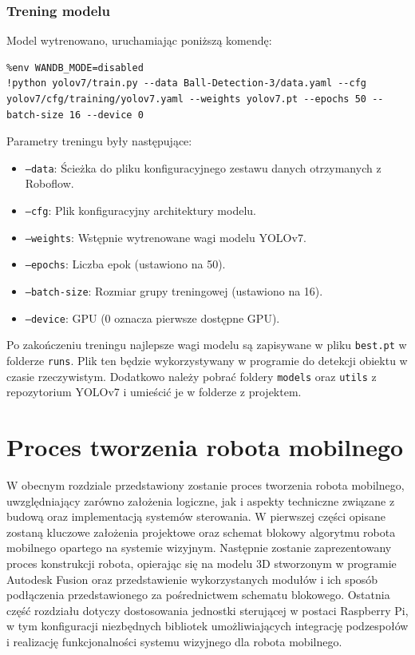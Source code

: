 \documentclass[a4paper,twoside,12pt]{book}
\begin{document}
\subsection{Trening modelu}
Model wytrenowano, uruchamiając poniższą komendę:
\begin{verbatim}
%env WANDB_MODE=disabled
!python yolov7/train.py --data Ball-Detection-3/data.yaml --cfg yolov7/cfg/training/yolov7.yaml --weights yolov7.pt --epochs 50 --batch-size 16 --device 0
\end{verbatim}
Parametry treningu były następujące:
\begin{itemize}
    \item \texttt{--data}: Ścieżka do pliku konfiguracyjnego zestawu danych otrzymanych z Roboflow.
    \item \texttt{--cfg}: Plik konfiguracyjny architektury modelu.
    \item \texttt{--weights}: Wstępnie wytrenowane wagi modelu YOLOv7.
    \item \texttt{--epochs}: Liczba epok (ustawiono na 50).
    \item \texttt{--batch-size}: Rozmiar grupy treningowej (ustawiono na 16).
    \item \texttt{--device}: GPU (0 oznacza pierwsze dostępne GPU).
\end{itemize}
Po zakończeniu treningu najlepsze wagi modelu są zapisywane w pliku \texttt{best.pt} w folderze \texttt{runs}. Plik ten będzie wykorzystywany w programie do detekcji obiektu w czasie rzeczywistym.
Dodatkowo należy pobrać foldery \texttt{models} oraz \texttt{utils} z repozytorium YOLOv7 i umieścić je w folderze z projektem.

\chapter{Proces tworzenia robota mobilnego}
\label{ch:04}
W obecnym rozdziale przedstawiony zostanie proces tworzenia robota mobilnego, uwzględniający zarówno założenia logiczne, jak i aspekty techniczne związane z budową oraz implementacją systemów sterowania. W pierwszej części opisane zostaną kluczowe założenia projektowe oraz schemat blokowy algorytmu robota mobilnego opartego na systemie wizyjnym. Następnie zostanie zaprezentowany proces konstrukcji robota, opierając się na modelu 3D stworzonym w programie Autodesk Fusion oraz przedstawienie wykorzystanych modułów i ich sposób podłączenia przedstawionego za pośrednictwem schematu blokowego. Ostatnia część rozdziału dotyczy dostosowania jednostki sterującej w postaci Raspberry Pi, w tym konfiguracji niezbędnych bibliotek umożliwiających integrację podzespołów i realizację funkcjonalności systemu wizyjnego dla robota mobilnego.
\end{document}

